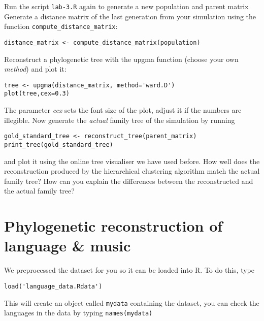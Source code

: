 \documentclass[a4paper, 9pt]{article}
\begin{document}
\begin{exercise}
    \action Run the script \verb|lab-3.R| again to generate a new population and parent matrix
    \action Generate a distance matrix of the last generation from your simulation using the function \verb|compute_distance_matrix|:
    \begin{lstlisting}
distance_matrix <- compute_distance_matrix(population)
    \end{lstlisting}
    \action Reconstruct a phylogenetic tree with the upgma function (choose your own \textit{method}) and plot it:
    \begin{lstlisting}
tree <- upgma(distance_matrix, method='ward.D')
plot(tree,cex=0.3)
    \end{lstlisting}    
    The parameter \textit{cex} sets the font size of the plot, adjust it if the numbers are illegible.
    \action Now generate the \textit{actual} family tree of the simulation by running\begin{lstlisting}
gold_standard_tree <- reconstruct_tree(parent_matrix)
print_tree(gold_standard_tree)
\end{lstlisting} 
and plot it using the online tree visualiser we have used before.
How well does the reconstruction produced by the hierarchical clustering algorithm match the actual family tree?
    \askstar How can you explain the differences between the reconstructed and the actual family tree?
\end{exercise}


\section{Phylogenetic reconstruction of language \& music}

\begin{exercise}
\action We preprocessed the dataset for you so it can be loaded into R. To do this, type
\begin{lstlisting}
load('language_data.Rdata')
\end{lstlisting}
\end{exercise}

This will create an object called \verb|mydata| containing the dataset,
you can check the languages in the data by typing \verb|names(mydata)|
\end{document}
